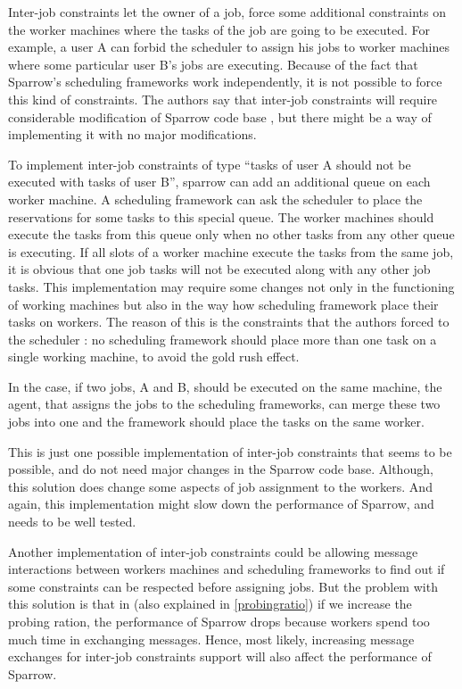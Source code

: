 \documentclass[11pt]{article}
\begin{document}
		Inter-job constraints let the owner of a job, force some additional constraints on the worker machines where the tasks of the job are going to be executed. For example, a user A can forbid the scheduler to assign his jobs to worker machines where some particular user B's jobs are executing. Because of the fact that Sparrow's scheduling frameworks work independently, it is not possible to force this kind of constraints. The authors say that inter-job constraints will require considerable modification of Sparrow code base \cite[section 8]{sparrow}, but there might be a way of implementing it with no major modifications.
		
		To implement inter-job constraints of type ``tasks of user A should not be executed with tasks of user B'', sparrow can add an additional queue on each worker machine. A scheduling framework can ask the scheduler to place the reservations for some tasks to this special queue. The worker machines should execute the tasks from this queue only when no other tasks from any other queue is executing. If all slots of a worker machine execute the tasks from the same job, it is obvious that one job tasks will not be executed along with any other job tasks. This implementation may require some changes not only in the functioning of working machines but also in the way how scheduling framework place their tasks on workers. The reason of this is the constraints that the authors forced to the scheduler \cite[section 5]{sparrow}: no scheduling framework should place more than one task on a single working machine, to avoid the gold rush effect.
		
		In the case, if two jobs, A and B, should be executed on the same machine, the agent, that assigns the jobs to the scheduling frameworks, can merge these two jobs into one and the framework should place the tasks on the same worker.
		
		This is just one possible implementation of inter-job constraints that seems to be possible, and do not need major changes in the Sparrow code base. Although, this solution does change some aspects of job assignment to the workers. And again, this implementation might slow down the performance of Sparrow, and needs to be well tested.
		
		Another implementation of inter-job constraints could be allowing message interactions between workers machines and scheduling frameworks to find out if some constraints can be respected before assigning jobs. But the problem with this solution is that in \cite[subsection 7.9]{sparrow} (also explained in \ref{probingratio}) if we increase the probing ration, the performance of Sparrow drops because workers spend too much time in exchanging messages. Hence, most likely, increasing message exchanges for inter-job constraints support will also affect the performance of Sparrow.
\end{document}

